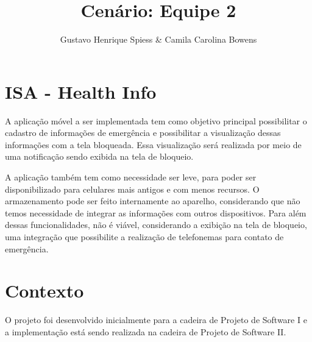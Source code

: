 \documentclass[a4paper]{article}
\title{Cenário: Equipe 2}
\author{Gustavo Henrique Spiess \& Camila Carolina Bowens}
\begin{document}
\maketitle

\section{ISA - Health Info}

A aplicação móvel a ser implementada tem como objetivo principal possibilitar o
cadastro de informações de emergência e possibilitar a visualização dessas
informações com a tela bloqueada. Essa visualização será realizada por meio de
uma notificação sendo exibida na tela de bloqueio.

A aplicação também tem como necessidade ser leve, para poder ser disponibilizado
para celulares mais antigos e com menos recursos. O armazenamento pode ser feito
internamente ao aparelho, considerando que não temos necessidade de integrar as
informações com outros dispositivos. Para além dessas funcionalidades, não é
viável, considerando a exibição na tela de bloqueio, uma integração que
possibilite a realização de telefonemas para contato de emergência.

\section{Contexto}

O projeto foi desenvolvido inicialmente para a cadeira de Projeto de Software I
e a implementação está sendo realizada na cadeira de Projeto de Software II.
\end{document}
